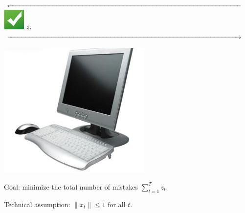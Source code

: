 \documentclass[landscape,a0a,final]{a0poster}
\begin{document}
\begin{multicols}{3}
\begin{minipage}{0.35\linewidth}
\begin{minipage}{0.3\linewidth}
\\
\vspace{-0.3cm}
$\xleftarrow{\hspace*{\linewidth}}$
\\
\includegraphics[width=0.3\linewidth]{figures/feedback.png} $z_t$
\\
\vspace{-0.3cm}
$\xrightarrow{\hspace*{\linewidth}}$
\end{minipage}
\begin{minipage}{0.3\linewidth}
\vspace{6cm}
\includegraphics[width=1.2\linewidth]{figures/learner.png}
\end{minipage}
\end{minipage}

\vspace{1cm}
Goal: minimize the total number of mistakes
$\sum_{t=1}^T z_t$.

\vspace*{0.5cm}
Technical assumption: $\| x_t \| \leq 1$ for all $t$.


\end{multicols}
\end{document}

